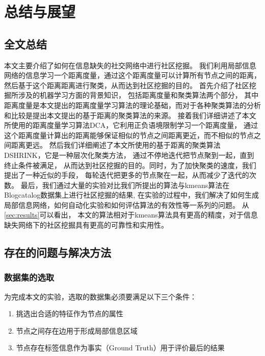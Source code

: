 \chapter{总结与展望}
\label{chap:summary}

\section{全文总结}

本文主要介绍了如何在信息缺失的社交网络中进行社区挖掘。
我们利用局部信息网络的信息学习一个距离度量，通过这个距离度量可以计算所有节点之间的距离，
然后基于这个距离距离进行聚类，从而达到社区挖掘的目的。
首先介绍了社区挖掘所涉及的机器学习方面的背景知识，
包括距离度量和聚类算法两个部分，
其中距离度量是本文提出的距离度量学习算法的理论基础，而对于各种聚类算法的分析和比较是提出本文提出的基于距离的聚类算法的来源。
接着我们详细讲述了本文所使用的距离度量学习算法DCA，它利用正负语境限制学习一个距离度量，
通过这个距离度量计算出的距离能够保证相似的节点之间距离更近，而不相似的节点之间距离更远。
然后我们详细阐述了本文所使用的基于距离的聚类算法DSHRINK，它是一种层次化聚类方法，
通过不停地迭代把节点聚到一起，直到终止条件被满足，
从而达到社区挖掘的目的。同时，为了加快聚类的速度，我们提出了一种近似的手段，
每轮迭代把更多的节点聚在一起，从而减少了迭代的次数。
最后，我们通过大量的实验对比我们所提出的算法与kmeans算法在
Blogcatalog数据集上进行社区挖掘的结果,
在实验的过程中，我们解决了如何生成局部信息网络，如何自动化实验和如何评估算法的有效性等一系列的问题。
从\ref{sec:results}可以看出， 本文的算法相对于kmeans算法具有更高的精度，对于信息缺失网络下的社区挖掘具有更高的可靠性和实用性。

\section{存在的问题与解决方法}

\subsection{数据集的选取}

为完成本文的实验，选取的数据集必须要满足以下三个条件：

\begin{enumerate}
\item 挑选出合适的特征作为节点的属性
\item 节点之间存在边用于形成局部信息区域
\item 节点存在标签信息作为事实（Ground Truth）用于评价最后的结果
\end{enumerate}

